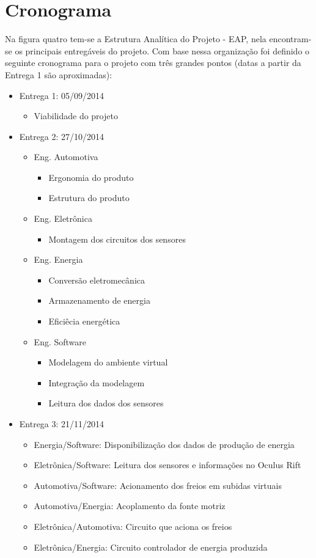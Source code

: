 \section{Cronograma}
Na figura quatro tem-se a Estrutura Analítica do Projeto - EAP, nela encontram-se os principais entregáveis do projeto. Com base nessa organização foi definido o seguinte cronograma para o projeto com três grandes pontos (datas a partir da Entrega 1 são aproximadas):
\begin{itemize}
  \item Entrega 1: 05/09/2014
    \begin{itemize}
      \item Viabilidade do projeto
    \end{itemize}
  \item Entrega 2: 27/10/2014
    \begin{itemize}
      \item Eng. Automotiva
        \begin{itemize}
          \item Ergonomia do produto
          \item Estrutura do produto
        \end{itemize}
      \item Eng. Eletrônica
        \begin{itemize}
          \item Montagem dos circuitos dos sensores
        \end{itemize}
      \item Eng. Energia
        \begin{itemize}
          \item Conversão eletromecânica
          \item Armazenamento de energia
          \item Eficiêcia energética
        \end{itemize}
      \item Eng. Software
        \begin{itemize}
          \item Modelagem do ambiente virtual
          \item Integração da modelagem
          \item Leitura dos dados dos sensores
        \end{itemize}
    \end{itemize}
  \item Entrega 3: 21/11/2014
    \begin{itemize}
      \item Energia/Software: Disponibilização dos dados de produção de energia
      \item Eletrônica/Software: Leitura dos sensores e informações no Oculus Rift
      \item Automotiva/Software: Acionamento dos freios em subidas virtuais
      \item Automotiva/Energia: Acoplamento da fonte motriz
      \item Eletrônica/Automotiva: Circuito que aciona os freios
      \item Eletrônica/Energia: Circuito controlador de energia produzida
    \end{itemize}
\end{itemize}
